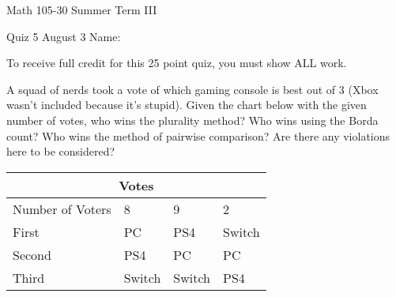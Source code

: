\documentclass[11pt,epsfig]{article}
\begin{document}
Math 105-30 Summer Term III 

Quiz 5 August 3 \hspace{1.9in} {Name:} {\underline {\hspace{3.5in}}}
\vspace{1pc}

To receive full credit for this 25 point quiz, you must show ALL work.
\vspace{1pc}

\begin{problem}{25}
A squad of nerds took a vote of which gaming console is best out of 3 (Xbox wasn't included because it's stupid). Given the chart below with the given number of votes, who wins the plurality method? Who wins using the Borda count? Who wins the method of pairwise comparison? Are there any violations here to be considered?

\begin{tabular}{ |p{3cm}||p{3cm}|p{3cm}|p{3cm}|  }
 \hline
 \multicolumn{4}{|c|}{Votes} \\
 \hline
 Number of Voters &8&9&2\\
 \hline
 First   &    PC      &PS4    &  Switch\\
 Second&  PS4    & PC      &  PC\\
 Third &    Switch &Switch&  PS4\\
 \hline
\end{tabular}

\vfill
\end{problem}





\showpoints
\end{document}
